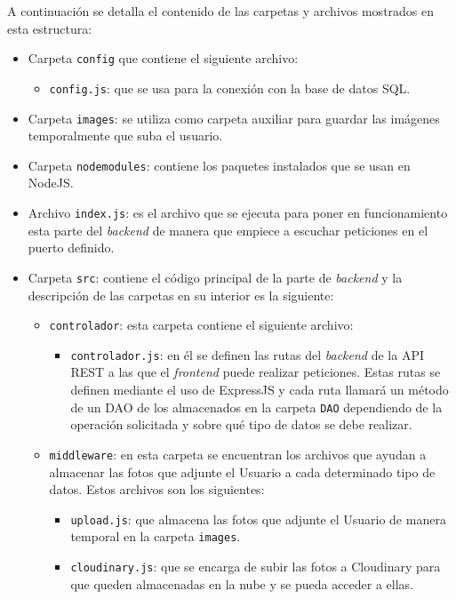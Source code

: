 A continuación se detalla el contenido de las carpetas y archivos mostrados en esta estructura:
\begin{itemize}
    \item Carpeta \texttt{config} que contiene el siguiente archivo:
    \begin{itemize}
        \item \texttt{config.js}: que se usa para la conexión con la base de datos SQL.
    \end{itemize}

    \item Carpeta \texttt{images}: se utiliza como carpeta auxiliar para guardar las imágenes temporalmente que suba el usuario.
    \item Carpeta \texttt{nodemodules}: contiene los paquetes instalados que se usan en NodeJS.
    \item Archivo \texttt{index.js}: es el archivo que se ejecuta para poner en funcionamiento esta parte del \textit{backend} de manera que empiece a escuchar peticiones en el puerto definido.
    \item Carpeta \texttt{src}: contiene el código principal de la parte de \textit{backend} y la descripción de las carpetas en su interior es la siguiente:
    \begin{itemize}
        \item \texttt{controlador}: esta carpeta contiene el siguiente archivo:
         \begin{itemize}
            \item \texttt{controlador.js}: en él se definen las rutas del \textit{backend} de la API REST a las que el \textit{frontend} puede realizar peticiones. Estas rutas se definen mediante el uso de ExpressJS y cada ruta llamará un método de un DAO de los almacenados en la carpeta \texttt{DAO} dependiendo de la operación solicitada y sobre qué tipo de datos se debe realizar.
        \end{itemize}
        
        
        \item \texttt{middleware}: en esta carpeta se encuentran los archivos que ayudan a almacenar las fotos que adjunte el Usuario a cada determinado tipo de datos. Estos archivos son los siguientes:
        \begin{itemize}
            \item \texttt{upload.js}: que almacena las fotos que adjunte el Usuario de manera temporal en la carpeta \texttt{images}.
            \item \texttt{cloudinary.js}: que se encarga de subir las fotos a Cloudinary para que queden almacenadas en la nube y se pueda acceder a ellas.
        \end{itemize}
        

\end{itemize}
\end{itemize}
